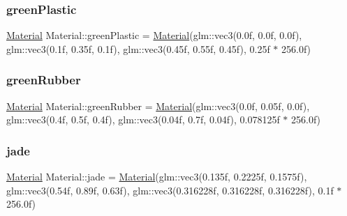 \mbox{\label{struct_material_abaddc1454d8d34f501be471246853856}} 
\subsubsection{\texorpdfstring{greenPlastic}{greenPlastic}}
{\footnotesize\ttfamily \mbox{\hyperlink{struct_material}{Material}} Material\+::green\+Plastic = \mbox{\hyperlink{struct_material}{Material}}(glm\+::vec3(0.\+0f, 0.\+0f, 0.\+0f), glm\+::vec3(0.\+1f, 0.\+35f, 0.\+1f), glm\+::vec3(0.\+45f, 0.\+55f, 0.\+45f), 0.\+25f $\ast$ 256.\+0f)\hspace{0.3cm}{\ttfamily [static]}}

\mbox{\label{struct_material_aab6e7659ecff08471027e084046cafe4}} 
\subsubsection{\texorpdfstring{greenRubber}{greenRubber}}
{\footnotesize\ttfamily \mbox{\hyperlink{struct_material}{Material}} Material\+::green\+Rubber = \mbox{\hyperlink{struct_material}{Material}}(glm\+::vec3(0.\+0f, 0.\+05f, 0.\+0f), glm\+::vec3(0.\+4f, 0.\+5f, 0.\+4f), glm\+::vec3(0.\+04f, 0.\+7f, 0.\+04f), 0.\+078125f $\ast$ 256.\+0f)\hspace{0.3cm}{\ttfamily [static]}}

\mbox{\label{struct_material_ab321b1fd760849c28860768bc08c3719}} 
\subsubsection{\texorpdfstring{jade}{jade}}
{\footnotesize\ttfamily \mbox{\hyperlink{struct_material}{Material}} Material\+::jade = \mbox{\hyperlink{struct_material}{Material}}(glm\+::vec3(0.\+135f, 0.\+2225f, 0.\+1575f), glm\+::vec3(0.\+54f, 0.\+89f, 0.\+63f), glm\+::vec3(0.\+316228f, 0.\+316228f, 0.\+316228f), 0.\+1f $\ast$ 256.\+0f)\hspace{0.3cm}{\ttfamily [static]}}

\mbox{\label{struct_material_a915ba1f28243cdd67be5ccc70d4073d8}} 
